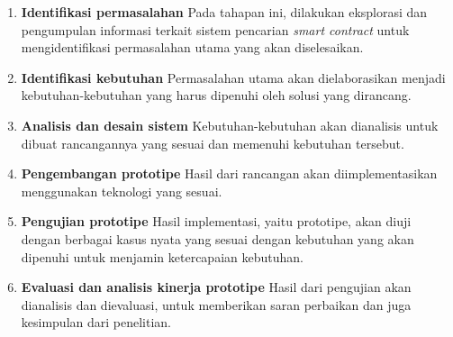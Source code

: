 \begin{enumerate}
  \item \textbf{Identifikasi permasalahan} \newline
        Pada tahapan ini, dilakukan eksplorasi dan pengumpulan informasi terkait sistem pencarian \textit{smart contract} untuk mengidentifikasi permasalahan utama yang akan diselesaikan.
  \item \textbf{Identifikasi kebutuhan} \newline
        Permasalahan utama akan dielaborasikan menjadi kebutuhan-kebutuhan yang harus dipenuhi oleh solusi yang dirancang.
  \item \textbf{Analisis dan desain sistem} \newline
        Kebutuhan-kebutuhan akan dianalisis untuk dibuat rancangannya yang sesuai dan memenuhi kebutuhan tersebut.
  \item \textbf{Pengembangan prototipe} \newline
        Hasil dari rancangan akan diimplementasikan menggunakan teknologi yang sesuai.
  \item \textbf{Pengujian prototipe} \newline
        Hasil implementasi, yaitu prototipe, akan diuji dengan berbagai kasus nyata yang sesuai dengan kebutuhan yang akan dipenuhi untuk menjamin ketercapaian kebutuhan.
  \item \textbf{Evaluasi dan analisis kinerja prototipe} \newline
        Hasil dari pengujian akan dianalisis dan dievaluasi, untuk memberikan saran perbaikan dan juga kesimpulan dari penelitian.
\end{enumerate}



